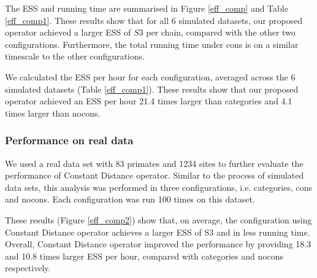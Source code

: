 \documentclass{bmcart}
\begin{document}
The ESS and running time are summarised in Figure \ref{eff_comp} and Table \ref{eff_comp1}. These results show that for all 6 simulated datasets, our proposed operator achieved a larger ESS of $S3$ per chain, compared with the other two configurations. Furthermore, the total running time under cons is on a similar timescale to the other configurations.

We calculated the ESS per hour for each configuration, averaged across the 6 simulated datasets (Table \ref{eff_comp1}). These results show that our proposed operator achieved an ESS per hour 21.4 times larger than categories and 4.1 times larger than nocons.


\subsubsection*{Performance on real data}
We used a real data set with 83 primates and 1234 sites \cite{finstermeier2013mitogenomic} to further evaluate the performance of Constant Distance operator. Similar to the process of simulated data sets, this analysis was performed in three configurations, i.e. categories, cons and nocons. Each configuration was run 100 times on this dataset.

These results (Figure \ref{eff_comp2}) show that, on average, the configuration using Constant Distance operator achieves a larger ESS of S3 and in less running time. Overall, Constant Distance operator improved the performance by providing 18.3 and 10.8 times larger ESS per hour, compared with categories and nocons respectively.
\end{document}
